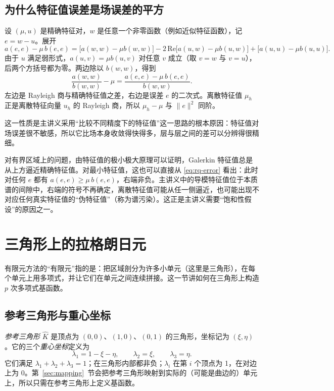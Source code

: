 \documentclass[11pt,a4paper,fontset=fandol]{ctexart}
\begin{document}
\subsection{为什么特征值误差是场误差的平方}
\label{sec:square}

设 $(\mu,u)$ 是精确特征对，$w$ 是任意一个非零函数（例如近似特征函数），记 $e=w-u$。展开
\[
a(e,e)-\mu\,b(e,e)=\bigl[a(w,w)-\mu b(w,w)\bigr]-2\,\mathrm{Re}\bigl[a(u,w)-\mu b(u,w)\bigr]+\bigl[a(u,u)-\mu b(u,u)\bigr].
\]
由于 $u$ 满足弱形式，$a(u,v)=\mu b(u,v)$ 对任意 $v$ 成立（取 $v=w$ 与 $v=u$），后两个方括号都为零。两边除以 $b(w,w)$，得到
\begin{equation}
\label{eq:rq-error}
\frac{a(w,w)}{b(w,w)}-\mu=\frac{a(e,e)-\mu\,b(e,e)}{b(w,w)} .
\end{equation}
左边是 Rayleigh 商与精确特征值之差，右边是误差 $e$ 的二次式。离散特征值 $\mu_h$ 正是离散特征向量 $u_h$ 的 Rayleigh 商，所以 $\mu_h-\mu$ 与 $\|e\|^2$ 同阶。

这一性质是主讲义采用“比较不同精度下的特征值”这一思路的根本原因：特征值对场误差很不敏感，所以它比场本身收敛得快得多，层与层之间的差可以分辨得很精细。

\begin{remark}
对有界区域上的问题，由特征值的极小极大原理可以证明，Galerkin 特征值总是从上方逼近精确特征值。对最小特征值，这也可以直接从 \eqref{eq:rq-error} 看出：此时对任何 $e$ 都有 $a(e,e)\ge\mu\,b(e,e)$，右端非负。主讲义中的导模特征值位于本质谱的间隙中，右端的符号不再确定，离散特征值可能从任一侧逼近，也可能出现不对应任何真实特征值的“伪特征值”（称为谱污染）。这正是主讲义需要“饱和性假设”的原因之一。
\end{remark}

\section{三角形上的拉格朗日元}
\label{sec:lagrange}

有限元方法的“有限元”指的是：把区域剖分为许多小单元（这里是三角形），在每个单元上用多项式，并让它们在单元之间连续拼接。这一节讲如何在三角形上构造 $p$ 次多项式基函数。

\subsection{参考三角形与重心坐标}

\emph{参考三角形} $\widehat K$ 是顶点为 $(0,0)$、$(1,0)$、$(0,1)$ 的三角形，坐标记为 $(\xi,\eta)$。它的三个\emph{重心坐标}定义为
\[
\lambda_1=1-\xi-\eta,\qquad\lambda_2=\xi,\qquad\lambda_3=\eta .
\]
它们满足 $\lambda_1+\lambda_2+\lambda_3=1$；在三角形内部都非负；$\lambda_i$ 在第 $i$ 个顶点为 1，在对边上为 0。第~\ref{sec:mapping}~节会把参考三角形映射到实际的（可能是曲边的）单元上，所以只需在参考三角形上定义基函数。
\end{document}
